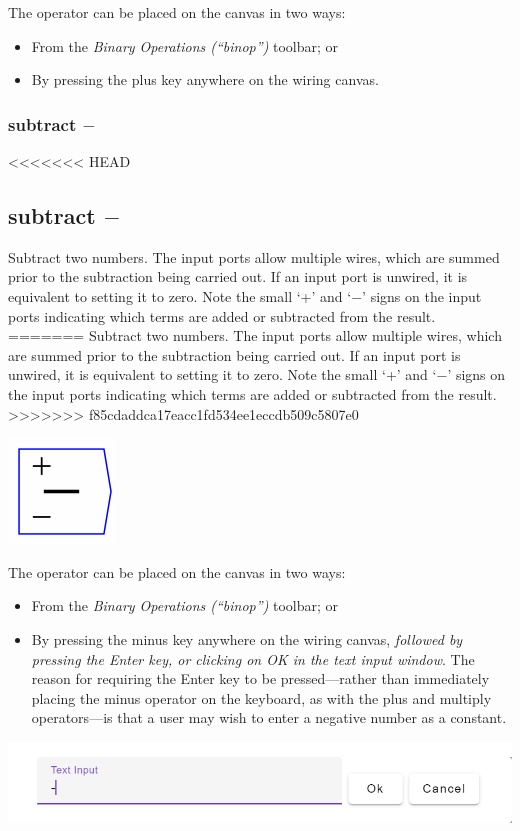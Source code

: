 The operator can be placed on the canvas in two ways:
\begin{itemize}
\item From the \emph{Binary Operations (``binop'') }toolbar; or 
\item By pressing the plus key anywhere on the wiring canvas. 
\end{itemize}

\subsubsection{subtract $-$}

<<<<<<< HEAD
\subsection{subtract $-$}\label{Operation:subtract} Subtract two
numbers. The input ports allow multiple wires, which are summed prior
to the subtraction being carried out. If an input port is unwired, it
is equivalent to setting it to zero. Note the small `+' and `$-$'
signs on the input ports indicating which terms are added or
subtracted from the result.
=======
\label{Operation:subtract} Subtract two numbers. The input ports
allow multiple wires, which are summed prior to the subtraction being
carried out. If an input port is unwired, it is equivalent to setting
it to zero. Note the small `+' and `$-$' signs on the input ports
indicating which terms are added or subtracted from the result.
>>>>>>> f85cdaddca17eacc1fd534ee1eccdb509c5807e0

\includegraphics{images/MinusKey}

The operator can be placed on the canvas in two ways:
\begin{itemize}
\item From the \emph{Binary Operations (``binop'')} toolbar; or 
\item By pressing the minus key anywhere on the wiring canvas, \textit{followed
by pressing the Enter key, or clicking on OK in the text input window}.
The reason for requiring the Enter key to be pressed---rather than
immediately placing the minus operator on the keyboard, as with the
plus and multiply operators---is that a user may wish to enter a
negative number as a constant. 
\end{itemize}
\includegraphics{images/MinusTextWindow}

